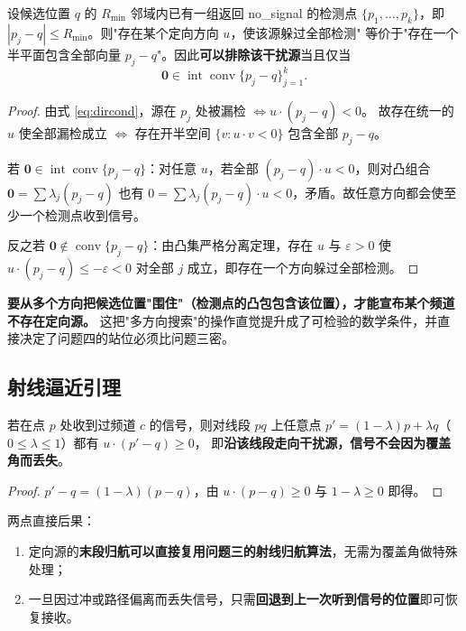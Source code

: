 \begin{theorem}[认证判据]\label{thm:cert}
设候选位置 $q$ 的 $R_{\min}$ 邻域内已有一组返回 no\_signal 的检测点
$\{p_1,\dots,p_k\}$，即 $|p_j-q|\le R_{\min}$。则"存在某个定向方向 $u$，使该源躲过全部检测"
等价于"存在一个半平面包含全部向量 $p_j-q$"。因此\textbf{可以排除该干扰源}当且仅当
\begin{equation}
\mathbf 0\in\operatorname{int}\operatorname{conv}\{p_j-q\}_{j=1}^{k}.
\label{eq:cert}
\end{equation}
\end{theorem}
\begin{proof}
由式 \eqref{eq:dircond}，源在 $p_j$ 处被漏检 $\iff u\cdot(p_j-q)<0$。
故存在统一的 $u$ 使全部漏检成立 $\iff$ 存在开半空间 $\{v:u\cdot v<0\}$ 包含全部 $p_j-q$。

若 $\mathbf 0\in\operatorname{int}\operatorname{conv}\{p_j-q\}$：对任意 $u$，若全部
$(p_j-q)\cdot u<0$，则对凸组合 $\mathbf 0=\sum\lambda_j(p_j-q)$ 也有
$0=\sum\lambda_j(p_j-q)\cdot u<0$，矛盾。故任意方向都会使至少一个检测点收到信号。

反之若 $\mathbf 0\notin\operatorname{conv}\{p_j-q\}$：由凸集严格分离定理，存在 $u$ 与
$\varepsilon>0$ 使 $u\cdot(p_j-q)\le-\varepsilon<0$ 对全部 $j$ 成立，即存在一个方向躲过全部检测。
\end{proof}

\begin{keybox}[title=工程含义]
\textbf{要从多个方向把候选位置"围住"（检测点的凸包包含该位置），才能宣布某个频道不存在定向源。}
这把"多方向搜索"的操作直觉提升成了可检验的数学条件，并直接决定了问题四的站位必须比问题三密。
\end{keybox}

\subsection{射线逼近引理}

\begin{theorem}[射线逼近引理]\label{thm:ray}
若在点 $p$ 处收到过频道 $c$ 的信号，则对线段 $pq$ 上任意点
$p'=(1-\lambda)p+\lambda q$（$0\le\lambda\le1$）都有 $u\cdot(p'-q)\ge0$，
即\textbf{沿该线段走向干扰源，信号不会因为覆盖角而丢失}。
\end{theorem}
\begin{proof}
$p'-q=(1-\lambda)(p-q)$，由 $u\cdot(p-q)\ge0$ 与 $1-\lambda\ge0$ 即得。
\end{proof}

两点直接后果：
\begin{enumerate}[leftmargin=1.8em]
  \item 定向源的\textbf{末段归航可以直接复用问题三的射线归航算法}，无需为覆盖角做特殊处理；
  \item 一旦因过冲或路径偏离而丢失信号，只需\textbf{回退到上一次听到信号的位置}即可恢复接收。
\end{enumerate}

